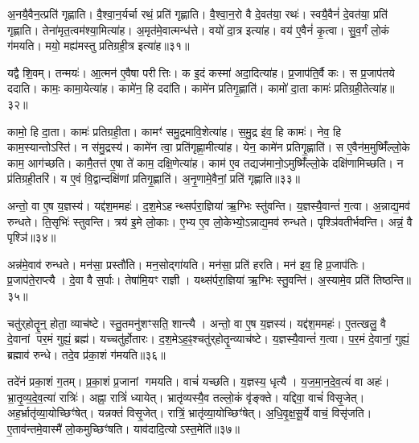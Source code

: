 अ॒नयै॒वैन॒त्प्रति॑ गृह्णाति।
वै॒श्वा॒न॒र्यर्चा रथं॒ प्रति॑ गृह्णाति।
वै॒श्वा॒न॒रो वै दे॒वत॑या॒ रथः॑।
स्वयै॒वैनं॑ दे॒वत॑या॒ प्रति॑ गृह्णाति।
तेना॑मृत॒त्वम॑श्या॒मित्या॑ह।
अ॒मृत॑मे॒वात्मन्ध॑त्ते।
वयो॑ दा॒त्र इत्या॑ह।
वय॑ ए॒वैनं॑ कृ॒त्वा।
सु॒व॒र्गं लो॒कं ग॑मयति।
मयो॒ मह्य॑मस्तु प्रतिग्रही॒त्र इत्या॑ह॥३१॥

यद्वै शि॒वम्।
तन्मयः॑।
आ॒त्मन॑ ए॒वैषा परीत्तिः।
क इ॒दं कस्मा॑ अदा॒दित्या॑ह।
प्र॒जाप॑ति॒र्वै कः।
स प्र॒जाप॑तये ददाति।
कामः॒ कामा॒येत्या॑ह।
कामे॑न॒ हि ददा॑ति।
कामे॑न प्रतिगृ॒ह्णाति॑।
कामो॑ दा॒ता कामः॑ प्रतिग्रही॒तेत्या॑ह॥३२॥

कामो॒ हि दा॒ता।
कामः॑ प्रतिग्रही॒ता।
कामꣳ॑ समु॒द्रमावि॒शे\-त्या॑ह।
स॒मु॒द्र इ॑व॒ हि कामः॑।
नेव॒ हि काम॒स्यान्तो\-ऽस्ति॑।
न स॑मु॒द्रस्य॑।
कामे॑न त्वा॒ प्रति॑\-गृह्णा॒मीत्या॑ह।
येन॒ कामे॑न प्रतिगृ॒ह्णाति॑।
स ए॒वैन॑म॒मुष्मिँ॑ल्लो॒के काम॒ आग॑च्छति।
कामै॒तत्त॑ ए॒षा ते॑ काम॒ दक्षि॒णेत्या॑ह।
काम॑ ए॒व तद्यज॑मानो॒\-ऽमुष्मिँ॑ल्लो॒के दक्षि॑णामिच्छति।
न प्र॑तिग्रही॒तरि॑।
य ए॒वं वि॒द्वान्दक्षि॑णां प्रतिगृ॒ह्णाति॑।
अ॒नृ॒णामे॒वैनां॒ प्रति॑ गृह्णाति॥३३॥\anuvakamend[व्ली॒ना॒त्यश्व॒मित्या॑हाङ्गीर॒सः प्र॑तिग्रही॒त्र इत्या॑ह प्रतिग्रही॒तेत्या॑ह॒ दक्षि॒णेत्या॑ह च॒त्वारि॑ च]

अन्तो॒ वा ए॒ष य॒ज्ञस्य॑।
यद्द॑श॒ममहः॑।
द॒श॒मे\-ऽहन्थ्सर्परा॒ज्ञिया॑ ऋ॒ग्भिः स्तु॑वन्ति।
य॒ज्ञस्यै॒वान्तं॑ ग॒त्वा।
अ॒न्नाद्य॒मव॑ रुन्धते।
ति॒सृभिः॑ स्तुवन्ति।
त्रय॑ इ॒मे लो॒काः।
ए॒भ्य ए॒व लो॒केभ्यो॒\-ऽन्नाद्य॒मव॑ रुन्धते।
पृश्ञि॑वतीर्भवन्ति।
अन्नं॒ वै पृश्ञि॑॥३४॥

अन्न॑मे॒वाव॑ रुन्धते।
मन॑सा॒ प्रस्तौ॑ति।
मन॒सोद्गा॑यति।
मन॑सा॒ प्रति॑ हरति।
मन॑ इव॒ हि प्र॒जाप॑तिः।
प्र॒जाप॑ते॒राप्त्यै।
दे॒वा वै स॒र्पाः।
तेषा॑मि॒यꣳ राज्ञी।
यथ्स॑र्परा॒ज्ञिया॑ ऋ॒ग्भिः स्तु॒वन्ति॑।
अ॒स्यामे॒व प्रति॑ तिष्ठन्ति॥३५॥

चतु॑र्‌\mbox{}होतॄ॒न्॒ होता॒ व्याच॑ष्टे।
स्तु॒तमनु॑शꣳसति॒ शान्त्यै।
अन्तो॒ वा ए॒ष य॒ज्ञस्य॑।
यद्द॑श॒ममहः॑।
ए॒तत्खलु॒ वै दे॒वानां पर॒मं गुह्यं॒ ब्रह्म॑।
यच्चतु॑र्\mbox{}होतारः।
द॒श॒मे\-ऽह॒ꣴ॒श्चतु॑र्\-‌होतॄ॒न्व्याच॑ष्टे।
य॒ज्ञस्यै॒वान्तं॑ ग॒त्वा।
प॒र॒मं दे॒वानां॒ गुह्यं॒ ब्रह्माव॑ रुन्धे।
तदे॒व प्र॑का॒शं ग॑मयति॥३६॥

तदे॑नं प्रका॒शं ग॒तम्।
प्र॒का॒शं प्र॒जानां गमयति।
वाचं॑ यच्छति।
य॒ज्ञस्य॒ धृत्यै।
य॒ज॒मा॒न॒दे॒व॒त्यं॑ वा अहः॑।
भ्रा॒तृ॒व्य॒दे॒व॒त्या॑ रात्रिः॑।
अह्ना॒ रात्रिं॑ ध्यायेत्।
भ्रातृ॑व्यस्यै॒व तल्लो॒कं वृ॑ङ्क्ते।
यद्दिवा॒ वाचं॑ विसृ॒जेत्।
अह॒र्भ्रातृ॑व्या॒योच्छिꣳ॑षेत्।
यन्नक्तं॑ विसृ॒जेत्।
रात्रिं॒ भ्रातृ॑व्या॒योच्छिꣳ॑षेत्।
अ॒धि॒वृ॒क्ष॒सू॒र्ये वाचं॒ विसृ॑जति।
ए॒ताव॑न्तमे॒वास्मै॑ लो॒कमुच्छिꣳ॑षति।
याव॑दादि॒त्यो\-ऽस्त॒मेति॑॥३७॥\anuvakamend[पृश्ञि॑ तिष्ठन्ति गमयति शिꣳषे॒त्पञ्च॑ च]

